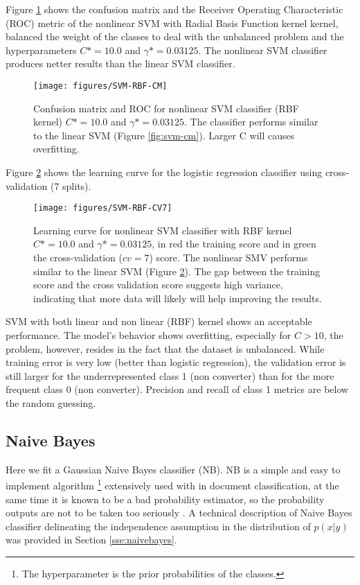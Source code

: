\documentclass[11pt]{article}
\theoremstyle{definition}
\theoremstyle{remark}
\begin{document}
Figure \ref{fig:svm-rbf-cm} shows the confusion matrix and the Receiver Operating Characteristic (ROC) metric of the nonlinear SVM with Radial Basis Function kernel kernel, balanced the weight of the classes to deal with the unbalanced problem and the hyperparameters $C*= 10.0$ and $\gamma *= 0.03125$. The nonlinear SVM classifier produces netter results than the linear SVM classifier.

\begin{figure}[H]
        \centering
        \texttt{[image: figures/SVM-RBF-CM]}
        \caption{Confusion matrix and ROC for nonlinear SVM classifier (RBF kernel) $C*= 10.0$ and $\gamma *= 0.03125$. The classifier performs similar to the linear SVM (Figure \ref{fig:svm-cm}). Larger C will causes overfitting.} \label{fig:svm-rbf-cm}
\end{figure}

Figure \ref{fig:svm-cv7} shows the learning curve for the logistic regression classifier using cross-validation (7 splits).
\begin{figure}[H]
        \centering
        \texttt{[image: figures/SVM-RBF-CV7]}
        \caption{Learning curve for nonlinear SVM classifier with RBF kernel $C*= 10.0$ and $\gamma *= 0.03125$, in red the training score and in green the cross-validation ($cv=7$) score. The nonlinear SMV performs similar to the linear SVM (Figure \ref{fig:svm-cv7}). The gap between the training score and the cross validation score suggests high variance, indicating that more data will likely will help improving the results. 
        } \label{fig:svm-cv7}
\end{figure}

SVM with both linear and non linear (RBF) kernel shows an acceptable performance. 
The model's behavior shows overfitting, especially for $C>10$, the problem, however, resides in the fact that the dataset is  unbalanced. While training error is very low (better than logistic regression), the validation error is still larger for the underrepresented class 1 (non converter) than for the more frequent class 0 (non converter). Precision and recall of class 1 metrics are below the random guessing. 

\subsection{Naive Bayes}
\label{se:resnaivebayes}

Here we fit a Gaussian Naive Bayes classifier (NB). NB is a simple and easy to implement algorithm \footnote{The hyperparameter is the prior probabilities of the classes.} extensively used with in document classification, at the same time it is known to be a bad probability estimator, so the probability outputs are not to be taken too seriously \cite{scikit-learn}. %
A technical description of Naive Bayes classifier delineating the independence assumption in the distribution of $p(x| y)$ was provided in Section \ref{sse:naivebayes}.
 
\end{document}
